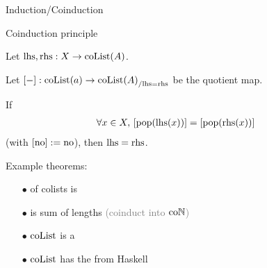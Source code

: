 \begin{frame}{Induction/Coinduction} %

  \begin{block}{Coinduction principle}
    
    \par Let $\mathrm{lhs}, \mathrm{rhs} : X \to \operatorname{coList}(A)$.
    \par Let $[{-}] : \operatorname{coList}(a) \to {\operatorname{coList}(A)}_{/ {\mathrm{lhs} = \mathrm{rhs}}}$ be the quotient map.
    \par If
    \begin{align*}
      \forall x \in X,\,
      [\operatorname{pop}(\mathrm{lhs}(x))]
      &= [\operatorname{pop}(\mathrm{rhs}(x))]
    \end{align*}
    (with $[\mathrm{no}] := \mathrm{no}$), then $\mathrm{lhs} = \mathrm{rhs}$.

  \end{block}

  \pause

  \par Example theorems:
  \begin{itemize}
    \item[$\bullet$] {
       of colists is 
    }
    \item[$\bullet$] {
       is sum of lengths \textcolor{gray}{(coinduct into $\mathrm{co}\mathbb{N}$)}
    }
    \item[$\bullet$] {
      $\operatorname{coList}$ is a 
    }
    \item[$\bullet$] {
      $\operatorname{coList}$ has the  from Haskell
    }
  \end{itemize}
  
\end{frame}
